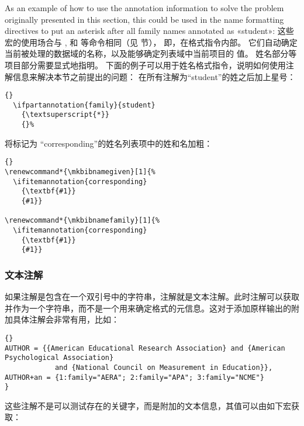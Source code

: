   As an example of how to use the annotation information to solve the problem originally presented in this section, this could be used in the name formatting directives to put an asterisk after all family names annotated as «student»:
这些宏的使用场合与 ,  和  等命令相同（见  节），
即，在格式指令内部。
它们自动确定当前被处理的数据域的名称，以及能够确定列表域中当前项目的  值。
姓名部分等项目部分需要显式地指明。
下面的例子可以用于姓名格式指令，说明如何使用注解信息来解决本节之前提出的问题：
在所有注解为“student”的姓之后加上星号：

\begin{lstlisting}[style=latex]{}
  \ifpartannotation{family}{student}
    {\textsuperscript{*}}
    {}%
\end{lstlisting}
%
将标记为 “corresponding”的姓名列表项中的姓和名加粗：

\begin{lstlisting}[style=latex]{}
\renewcommand*{\mkbibnamegiven}[1]{%
  \ifitemannotation{corresponding}
    {\textbf{#1}}
    {#1}}

\renewcommand*{\mkbibnamefamily}[1]{%
  \ifitemannotation{corresponding}
    {\textbf{#1}}
    {#1}}
\end{lstlisting}


\subsubsection{文本注解}


如果注解是包含在一个双引号中的字符串，注解就是文本注解。此时注解可以获取并作为一个字符串，而不是一个用来确定格式的元信息。这对于添加原样输出的附加具体注解会非常有用，比如：

\begin{lstlisting}[style=bibtex]{}
AUTHOR = {{American Educational Research Association} and {American Psychological Association}
            and {National Council on Measurement in Education}},
AUTHOR+an = {1:family="AERA"; 2:family="APA"; 3:family="NCME"}
}
\end{lstlisting}
%
这些注解不是可以测试存在的关键字，而是附加的文本信息，其值可以由如下宏获取：



